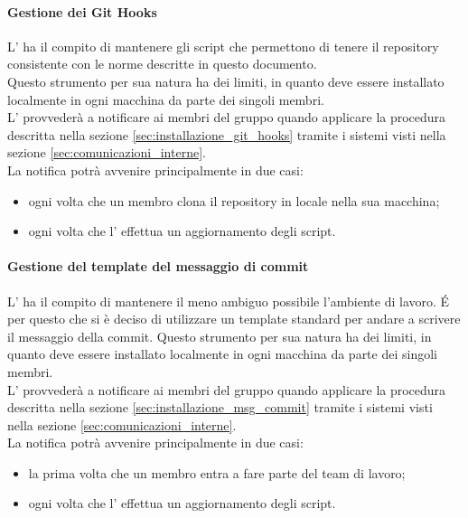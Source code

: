 			\paragraph{Gestione dei Git Hooks}
			L'\roleAdministrator{} ha il compito di mantenere gli script che permettono di tenere il repository\gloss{} consistente con le norme descritte in questo documento. \\
			Questo strumento per sua natura ha dei limiti, in quanto deve essere installato localmente in ogni macchina da parte dei singoli membri. \\
			L'\roleAdministrator{} provvederà a notificare ai membri del gruppo quando applicare la procedura descritta nella sezione \ref{sec:installazione_git_hooks} tramite i sistemi visti nella sezione \ref{sec:comunicazioni_interne}. \\
			La notifica potrà avvenire principalmente in due casi:
				\begin{itemize}
					\item ogni volta che un membro clona il repository\gloss{} in locale nella sua macchina;
					\item ogni volta che l'\roleAdministrator{} effettua un aggiornamento degli script.
				\end{itemize}
				
			\paragraph{Gestione del template del messaggio di commit}
			L'\roleAdministrator{} ha il compito di mantenere il meno ambiguo possibile l'ambiente di lavoro. \'E per questo che si è deciso di utilizzare un template\gloss{} standard per andare a scrivere il messaggio della commit\gloss{}.
			Questo strumento per sua natura ha dei limiti, in quanto deve essere installato localmente in ogni macchina da parte dei singoli membri. \\
			L'\roleAdministrator{} provvederà a notificare ai membri del gruppo quando applicare la procedura descritta nella sezione \ref{sec:installazione_msg_commit} tramite i sistemi visti nella sezione \ref{sec:comunicazioni_interne}. \\
			La notifica potrà avvenire principalmente in due casi:
				\begin{itemize}
					\item la prima volta che un membro entra a fare parte del team di lavoro;
					\item ogni volta che l'\roleAdministrator{} effettua un aggiornamento degli script.
				\end{itemize}
				
